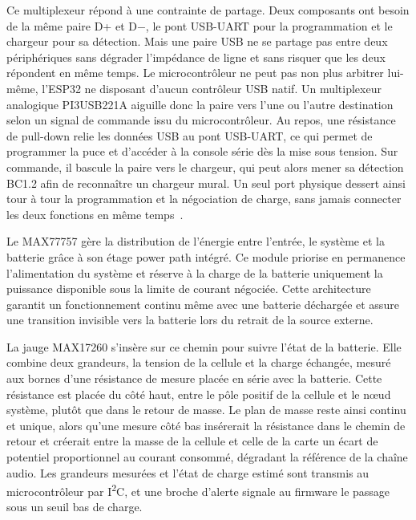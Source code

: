 Ce multiplexeur répond à une contrainte de partage. Deux composants ont besoin de la même paire D+ et D$-$, le pont USB-UART pour la programmation et le chargeur pour sa détection. Mais une paire USB ne se partage pas entre deux périphériques sans dégrader l'impédance de ligne et sans risquer que les deux répondent en même temps. Le microcontrôleur ne peut pas non plus arbitrer lui-même, l'ESP32 ne disposant d'aucun contrôleur USB natif. Un multiplexeur analogique PI3USB221A aiguille donc la paire vers l'une ou l'autre destination selon un signal de commande issu du microcontrôleur. Au repos, une résistance de pull-down relie les données USB au pont USB-UART, ce qui permet de programmer la puce et d'accéder à la console série dès la mise sous tension. Sur commande, il bascule la paire vers le chargeur, qui peut alors mener sa détection BC1.2 afin de reconnaître un chargeur mural. Un seul port physique dessert ainsi tour à tour la programmation et la négociation de charge, sans jamais connecter les deux fonctions en même temps~\cite{diodes_inc_PI3USB221A}.

Le MAX77757 gère la distribution de l'énergie entre l'entrée, le système et la batterie grâce à son étage power path intégré. Ce module priorise en permanence l'alimentation du système et réserve à la charge de la batterie uniquement la puissance disponible sous la limite de courant négociée. Cette architecture garantit un fonctionnement continu même avec une batterie déchargée et assure une transition invisible vers la batterie lors du retrait de la source externe.

La jauge MAX17260 s'insère sur ce chemin pour suivre l'état de la batterie. Elle combine deux grandeurs, la tension de la cellule et la charge échangée, mesuré aux bornes d'une résistance de mesure placée en série avec la batterie. Cette résistance est placée du côté haut, entre le pôle positif de la cellule et le nœud système, plutôt que dans le retour de masse. Le plan de masse reste ainsi continu et unique, alors qu'une mesure côté bas insérerait la résistance dans le chemin de retour et créerait entre la masse de la cellule et celle de la carte un écart de potentiel proportionnel au courant consommé, dégradant la référence de la chaîne audio. Les grandeurs mesurées et l'état de charge estimé sont transmis au microcontrôleur par I\textsuperscript{2}C, et une broche d'alerte signale au firmware le passage sous un seuil bas de charge.


